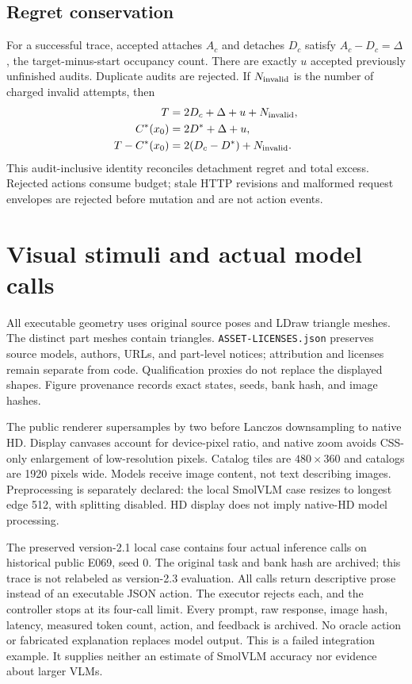 \subsection{Regret conservation}
For a successful trace, accepted attaches $A_c$ and detaches $D_c$
satisfy $A_c-D_c=\Delta$, the target-minus-start occupancy count.
There are exactly $u$ accepted previously unfinished audits.
Duplicate audits are rejected. If $N_{\rm invalid}$ is the number of
charged invalid attempts, then
\begin{align}
T &=2D_c+\Delta+u+N_{\rm invalid},\\
C^*(x_0)&=2D^*+\Delta+u,\\
T-C^*(x_0)&=2(D_c-D^*)+N_{\rm invalid}.
\end{align}
This audit-inclusive identity reconciles detachment regret and total
excess. Rejected actions consume budget; stale HTTP revisions and malformed
request envelopes are rejected before mutation and are not action events.

\section{Visual stimuli and actual model calls}
All executable geometry uses original source poses and LDraw triangle
meshes. The \MeshCount{} distinct part meshes contain \TriangleCount{} triangles.
\texttt{ASSET-LICENSES.json} preserves source models, authors, URLs, and
part-level notices; attribution and licenses remain separate from code.
Qualification proxies do not replace the displayed shapes.
Figure provenance records exact states, seeds, bank hash, and image hashes.

The public renderer supersamples by two before Lanczos downsampling to
native HD. Display canvases account for device-pixel ratio, and native
zoom avoids CSS-only enlargement of low-resolution pixels.
Catalog tiles are $480\times360$ and catalogs are 1920 pixels wide.
Models receive image content, not text describing images. Preprocessing
is separately declared: the local SmolVLM case resizes to longest edge
512, with splitting disabled. HD display does not imply native-HD model
processing.

The preserved version-2.1 local case contains four actual inference calls
on historical public E069, seed 0. The original task and bank hash are
archived; this trace is not relabeled as version-2.3 evaluation.
All calls return descriptive prose instead of an executable JSON action.
The executor rejects each, and the controller stops at its four-call limit.
Every prompt, raw response, image hash, latency, measured token count,
action, and feedback is archived. No oracle action or fabricated explanation
replaces model output. This is a failed integration example. It supplies
neither an estimate of SmolVLM accuracy nor evidence about larger VLMs.

